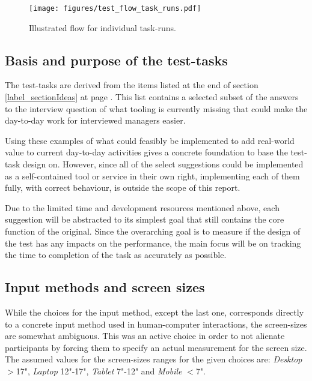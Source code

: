 {  \begin{figure}[h!]
    \centering
    \texttt{[image: figures/test\_flow\_task\_runs.pdf]}
    \caption{Illustrated flow for individual task-runs.}
  \end{figure}


  \subsection{Basis and purpose of the test-tasks}

  The test-tasks are derived from the items listed at the
  end of section \ref{label_sectionIdeas} at page \pageref{label_ideas}.
  This list contains a selected subset of the answers to the
  interview question of what tooling is currently missing that could make
  the day-to-day work for interviewed managers easier.

  Using these examples of what could feasibly be implemented to add
  real-world value to current day-to-day activities gives a concrete
  foundation to base the test-task design on. However, since all of
  the select suggestions could be implemented as a self-contained tool or
  service in their own right, implementing each of them fully, with
  correct behaviour, is outside the scope of this report.

  Due to the limited time and development resources mentioned above, each
  suggestion will be abstracted to its simplest goal that still contains
  the core function of the original. Since the overarching goal is to
  measure if the design of the test has any impacts on the performance,
  the main focus will be on tracking the time to completion of the task
  as accurately as possible.

  \subsection{Input methods and screen sizes}

   While the choices for the input
  method, except the last one, corresponds directly to a concrete input
  method used in human-computer interactions, the screen-sizes are somewhat
  ambiguous. This was an active choice in order to not alienate
  participants by forcing them to specify an actual measurement for the
  screen size. The assumed values for the screen-sizes ranges for the given
  choices are:
  \textit{Desktop} $>$17",
  \textit{Laptop}  12"-17",
  \textit{Tablet}  7"-12" and
  \textit{Mobile}  $<$7".

}

